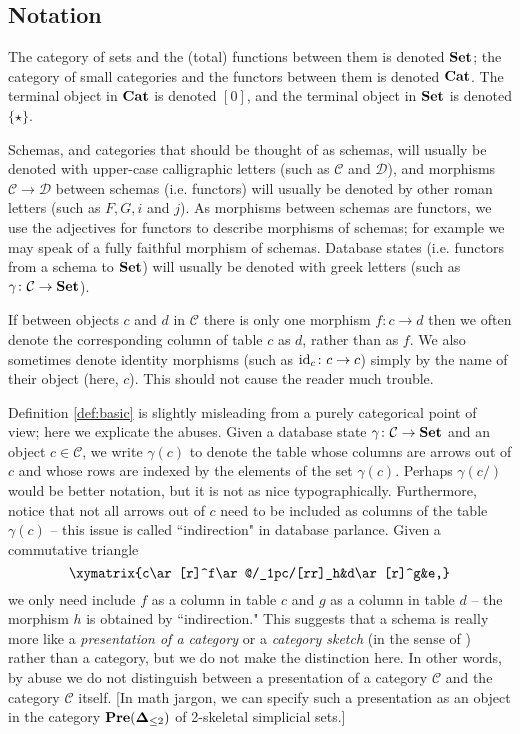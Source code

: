 \documentclass{amsart}
\def\tn{\textnormal}
\def\mc{\mathcal}
\def\to{\rightarrow}
\def\taking{\colon}
\def\id{\tn{id}}
\def\Cat{{\bf Cat}}
\def\Set{{\bf Set}}
\def\Pre{{\bf Pre}}
\def\mcC{\mc{C}}
\def\mcD{\mc{D}}
\theoremstyle{remark}
\theoremstyle{definition}
\def\singleton{{\{\star\}}}
\begin{document}
\subsection{Notation}\label{sec:notation}

The category of sets and the (total) functions between them is denoted $\Set$; the category of small categories and the functors between them is denoted $\Cat$.  The terminal object in $\Cat$ is denoted $[0]$, and the terminal object in $\Set$ is denoted $\singleton$.

Schemas, and categories that should be thought of as schemas, will usually be denoted with upper-case calligraphic letters (such as $\mcC$ and $\mcD$), and morphisms $\mcC\to\mcD$ between schemas (i.e. functors) will usually be denoted by other roman letters (such as $F, G, i$ and $j$).  As morphisms between schemas are functors, we use the adjectives for functors to describe morphisms of schemas; for example we may speak of a fully faithful morphism of schemas.  Database states (i.e. functors from a schema to $\Set$) will usually be denoted with greek letters (such as $\gamma\taking\mcC\to\Set$).

If between objects $c$ and $d$ in $\mcC$ there is only one morphism $f\taking c\to d$ then we often denote the corresponding column of table $c$ as $d$, rather than as $f$.  We also sometimes denote identity morphisms (such as $\id_c\taking c\to c$) simply by the name of their object (here, $c$).  This should not cause the reader much trouble.

Definition \ref{def:basic} is slightly misleading from a purely categorical point of view; here we explicate the abuses.  Given a database state $\gamma\taking\mcC\to\Set$ and an object $c\in\mcC$,  we write $\gamma(c)$ to denote the table whose columns are arrows out of $c$ and whose rows are indexed by the elements of the set $\gamma(c).$  Perhaps $\gamma(c/)$ would be better notation, but it is  not as nice typographically.  Furthermore, notice that not all arrows out of $c$ need to be included as columns of the table $\gamma(c)$ -- this issue is called ``indirection" in database parlance.  Given a commutative triangle $$\xymatrix{c\ar[r]^f\ar@/_1pc/[rr]_h&d\ar[r]^g&e,}$$ we only need include $f$ as a column in table $c$ and $g$ as a column in table $d$ -- the morphism $h$ is obtained by ``indirection."  This suggests that a schema is really more like a {\em presentation of a category} or a {\em category sketch} (in the sense of \cite{Mak}) rather than a category, but we do not make the distinction here.   In other words, by abuse we do not distinguish between a presentation of a category $\mcC$ and the category $\mcC$ itself.  [In math jargon, we can specify such a presentation as an object in the category $\Pre({\bf \Delta}_{\leq 2})$ of 2-skeletal simplicial sets.]
\end{document}
